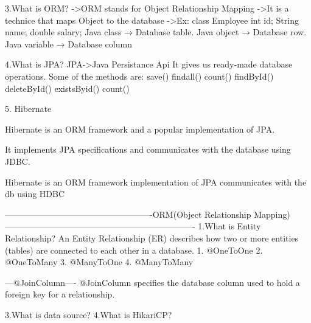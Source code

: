 													
				3.What is ORM?
					->ORM stands for Object Relationship Mapping
					->It is a technice that maps Object to the database
					->Ex:
						class Employee {
								int id;
								String name;
								double salary;
							}
						Java class → Database table.
						Java object → Database row.
						Java variable → Database column
						
						
				4.What is JPA?
					JPA->Java Persistance Api
						It gives us ready-made database operations.
						Some of the methods are:
							save()
							findall()
							count()
							findById()	
							deleteById()
							existsByid()
							count()
							
							
				5. Hibernate


				Hibernate is an ORM framework and a popular implementation of JPA.


				It implements JPA specifications and communicates with the database using JDBC.
				
				Hibernate is an ORM framework implementation of JPA communicates with the db using HDBC
															
----------------------------------------------------ORM(Object Relationship Mapping)-------------------------------------------------------------------
				1.What is Entity Relationship?
					An Entity Relationship (ER) describes how two or more entities (tables) are connected to each other in a database.
					1. @OneToOne
					2. @OneToMany
					3. @ManyToOne		
					4. @ManyToMany		
							
				---@JoinColumn----
					@JoinColumn specifies the database column used to hold a foreign key for a relationship.
				
				
				3.What is data source?
				4.What is HikariCP?
